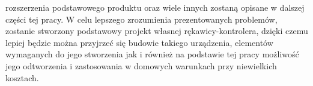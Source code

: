 rozszerzenia podstawowego produktu oraz wiele innych zostaną opisane w dalszej części tej pracy. W celu lepszego zrozumienia prezentowanych problemów, zostanie stworzony podstawowy projekt własnej rękawicy-kontrolera, dzięki czemu lepiej będzie można przyjrzeć się budowie takiego urządzenia, elementów wymaganych do jego stworzenia jak i również na podstawie tej pracy możliwość jego odtworzenia i zastosowania w domowych warunkach przy niewielkich kosztach.
